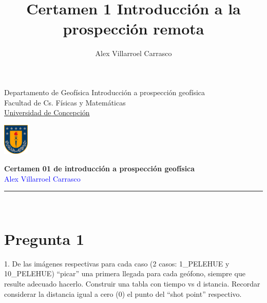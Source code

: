 \documentclass{article}
\title{Certamen 1 Introducción a la prospección remota}
\author{Alex Villarroel Carrasco}
\theoremstyle{mytheoremstyle}
\theoremstyle{mytheoremstyle}
\theoremstyle{myproblemstyle}
\begin{document}
\usetikzlibrary{positioning}
	\pagestyle{plain}
	\begin{flushleft}
		Departamento de Geofísica \hfill Introducción a prospección geofísica\\
		Facultad de Cs. Físicas y Matemáticas\\
		\underline{Universidad de Concepción}
	\end{flushleft}
	
	\begin{flushright}\vspace{-5mm}
		\includegraphics[height=1.5cm]{escudo.png}
	\end{flushright}
	
	\begin{center}\vspace{-1cm}
		\textbf{\large Certamen 01 de introducción a prospección geofísica}\\
		{\textcolor{blue}{Alex Villarroel Carrasco}}\\
	\end{center}
	\rule{\linewidth}{0.1mm}
	\\
    \section*{Pregunta 1}
	 1. De las imágenes respectivas para cada caso (2 casos: 1\_PELEHUE y 10\_PELEHUE)
		“picar” una primera llegada para cada geófono, siempre que resulte adecuado
		hacerlo. Construir una tabla con tiempo vs d istancia. Recordar considerar la
		distancia igual a cero (0) el punto del “shot point” respectivo.
\end{document}
